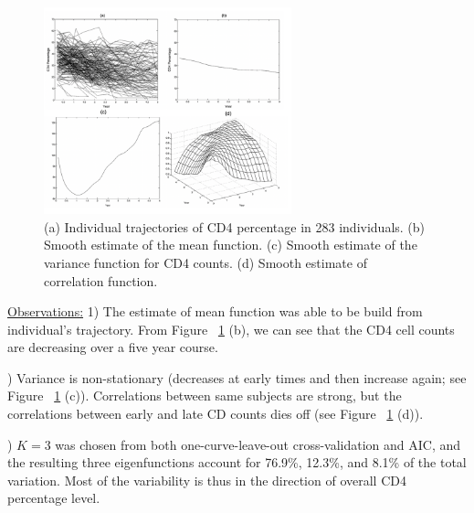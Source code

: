 \documentclass[11pt]{report}
\begin{document}
\begin{figure}
  \vspace{-1 cm}
  \centering
    \includegraphics[width=0.64\textwidth]{Figures/Figure1.png}
   	\vspace{-0.7 cm}
   	\caption{(a) Individual trajectories of CD4 percentage in 283 individuals. (b) Smooth estimate of the mean function. (c) Smooth estimate of the variance function for CD4 counts. (d) Smooth estimate of correlation function. }
   	\vspace{-0.3 cm}
	\label{fig:fig1}
\end{figure}

\noindent \underline{Observations:} 1) The estimate of mean function was able to be build from individual's trajectory. 
From Figure ~\ref{fig:fig1} (b), we can see that the CD4 cell counts are decreasing over a five year course. 

) Variance is non-stationary (decreases at early times and then increase again; see Figure ~\ref{fig:fig1} (c)). 
Correlations between same subjects are strong, but the correlations between early and late CD counts dies off (see Figure ~\ref{fig:fig1} (d)). 

) $K = 3$ was chosen from both one-curve-leave-out cross-validation and AIC, and the resulting three eigenfunctions account for 76.9\%, 12.3\%, and 8.1\% of the total variation. 
Most of the variability is thus in the direction of overall CD4 percentage level.  
\end{document}
